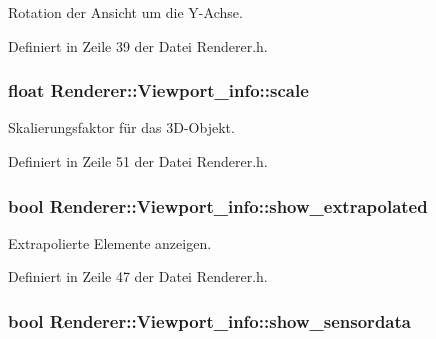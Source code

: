 Rotation der Ansicht um die Y-\/\-Achse. 



Definiert in Zeile 39 der Datei Renderer.\-h.

\hypertarget{structRenderer_1_1Viewport__info_a90128db9d24987d94ddd843646a4f03d}{
\subsubsection[{scale}]{\setlength{\rightskip}{0pt plus 5cm}float Renderer\-::\-Viewport\-\_\-info\-::scale}}\label{structRenderer_1_1Viewport__info_a90128db9d24987d94ddd843646a4f03d}


Skalierungsfaktor für das 3\-D-\/\-Objekt. 



Definiert in Zeile 51 der Datei Renderer.\-h.

\hypertarget{structRenderer_1_1Viewport__info_ac9d99216a6044d7048ba805f9f9b0815}{
\subsubsection[{show\-\_\-extrapolated}]{\setlength{\rightskip}{0pt plus 5cm}bool Renderer\-::\-Viewport\-\_\-info\-::show\-\_\-extrapolated}}\label{structRenderer_1_1Viewport__info_ac9d99216a6044d7048ba805f9f9b0815}


Extrapolierte Elemente anzeigen. 



Definiert in Zeile 47 der Datei Renderer.\-h.

\hypertarget{structRenderer_1_1Viewport__info_abd0ab0f20c5acc43128634b4b4cc1f52}{
\subsubsection[{show\-\_\-sensordata}]{\setlength{\rightskip}{0pt plus 5cm}bool Renderer\-::\-Viewport\-\_\-info\-::show\-\_\-sensordata}}\label{structRenderer_1_1Viewport__info_abd0ab0f20c5acc43128634b4b4cc1f52}


